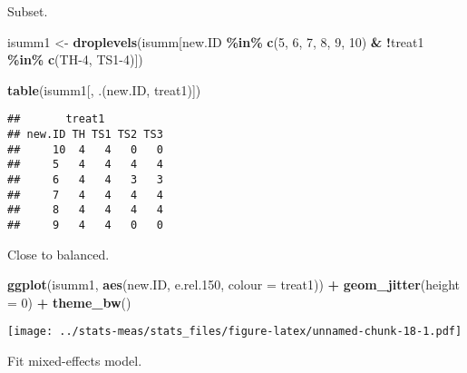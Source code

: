 \documentclass[
]{article}
\newenvironment{Shaded}{\begin{snugshade}}{\end{snugshade}}
\newcommand{\AttributeTok}[1]{\textcolor[rgb]{0.13,0.29,0.53}{#1}}
\newcommand{\DecValTok}[1]{\textcolor[rgb]{0.00,0.00,0.81}{#1}}
\newcommand{\FloatTok}[1]{\textcolor[rgb]{0.00,0.00,0.81}{#1}}
\newcommand{\FunctionTok}[1]{\textcolor[rgb]{0.13,0.29,0.53}{\textbf{#1}}}
\newcommand{\NormalTok}[1]{#1}
\newcommand{\OtherTok}[1]{\textcolor[rgb]{0.56,0.35,0.01}{#1}}
\newcommand{\SpecialCharTok}[1]{\textcolor[rgb]{0.81,0.36,0.00}{\textbf{#1}}}
\newcommand{\StringTok}[1]{\textcolor[rgb]{0.31,0.60,0.02}{#1}}
\begin{document}
Subset.

\begin{Shaded}
\begin{Highlighting}[]
\NormalTok{isumm1 }\OtherTok{\textless{}{-}} \FunctionTok{droplevels}\NormalTok{(isumm[new.ID }\SpecialCharTok{\%in\%} \FunctionTok{c}\NormalTok{(}\StringTok{\textquotesingle{}5\textquotesingle{}}\NormalTok{, }\StringTok{\textquotesingle{}6\textquotesingle{}}\NormalTok{, }\StringTok{\textquotesingle{}7\textquotesingle{}}\NormalTok{, }\StringTok{\textquotesingle{}8\textquotesingle{}}\NormalTok{, }\StringTok{\textquotesingle{}9\textquotesingle{}}\NormalTok{, }\StringTok{\textquotesingle{}10\textquotesingle{}}\NormalTok{) }\SpecialCharTok{\&} \SpecialCharTok{!}\NormalTok{treat1 }\SpecialCharTok{\%in\%} \FunctionTok{c}\NormalTok{(}\StringTok{\textquotesingle{}TH{-}4\textquotesingle{}}\NormalTok{, }\StringTok{\textquotesingle{}TS1{-}4\textquotesingle{}}\NormalTok{)])}
\end{Highlighting}
\end{Shaded}

\begin{Shaded}
\begin{Highlighting}[]
\FunctionTok{table}\NormalTok{(isumm1[, .(new.ID, treat1)])}
\end{Highlighting}
\end{Shaded}

\begin{verbatim}
##       treat1
## new.ID TH TS1 TS2 TS3
##     10  4   4   0   0
##     5   4   4   4   4
##     6   4   4   3   3
##     7   4   4   4   4
##     8   4   4   4   4
##     9   4   4   0   0
\end{verbatim}

Close to balanced.

\begin{Shaded}
\begin{Highlighting}[]
\FunctionTok{ggplot}\NormalTok{(isumm1, }\FunctionTok{aes}\NormalTok{(new.ID, e.rel}\FloatTok{.150}\NormalTok{, }\AttributeTok{colour =}\NormalTok{ treat1)) }\SpecialCharTok{+}
  \FunctionTok{geom\_jitter}\NormalTok{(}\AttributeTok{height =} \DecValTok{0}\NormalTok{) }\SpecialCharTok{+}
  \FunctionTok{theme\_bw}\NormalTok{()}
\end{Highlighting}
\end{Shaded}

\texttt{[image: ../stats-meas/stats\_files/figure-latex/unnamed-chunk-18-1.pdf]}

Fit mixed-effects model.
\end{document}
